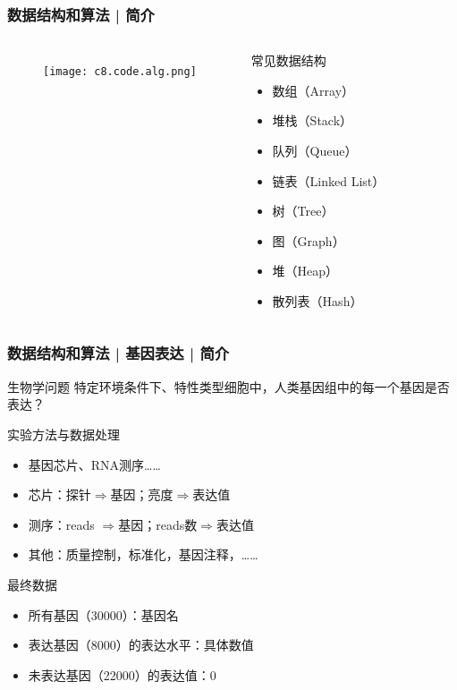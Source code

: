 \begin{frame}
  \frametitle{数据结构和算法 | 简介}
  \begin{columns}
    \begin{figure}
      \centering
      \texttt{[image: c8.code.alg.png]}
    \end{figure}
  \begin{block}{常见数据结构}
    \begin{itemize}
      \item 数组（Array）
      \item 堆栈（Stack）
      \item 队列（Queue）
      \item 链表（Linked List）
      \item 树（Tree）
      \item 图（Graph）
      \item 堆（Heap）
      \item 散列表（Hash）
    \end{itemize}
  \end{block}
\end{columns}
\end{frame}

\begin{frame}
  \frametitle{数据结构和算法 | 基因表达 | 简介}
  \begin{block}{生物学问题}
    特定环境条件下、特性类型细胞中，人类基因组中的每一个基因是否表达？
  \end{block}
  \pause
  \begin{block}{实验方法与数据处理}
    \begin{itemize}
      \item 基因芯片、RNA测序……
      \item 芯片：探针$\Rightarrow$基因；亮度$\Rightarrow$表达值
      \item 测序：reads $\Rightarrow$基因；reads数$\Rightarrow$表达值
      \item 其他：质量控制，标准化，基因注释，……
    \end{itemize}
  \end{block}
  \pause
  \begin{block}{最终数据}
    \begin{itemize}
      \item 所有基因（30000）：基因名
      \item 表达基因（8000）的表达水平：具体数值
      \item 未表达基因（22000）的表达值：0
    \end{itemize}
  \end{block}
\end{frame}

